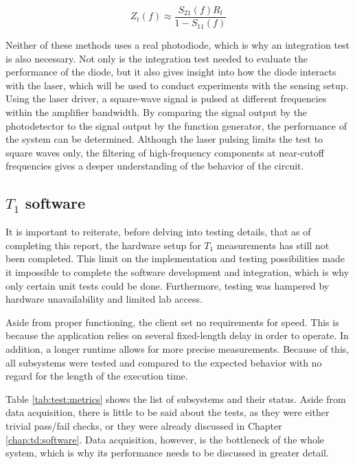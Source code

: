 \begin{equation}\label{eq:test:s11s22}
	Z_t(f) \approx \frac{S_{21}(f)R_l}{1 - S_{11}(f)}
\end{equation}

Neither of these methods uses a real photodiode, which is why an integration test is also necessary. Not only is the integration test needed to evaluate the performance of the diode, but it also gives insight into how the diode interacts with the laser, which will be used to conduct experiments with the sensing setup. Using the laser driver, a square-wave signal is pulsed at different frequencies within the amplifier bandwidth. By comparing the signal output by the photodetector to the signal output by the function generator, the performance of the system can be determined. Although the laser pulsing limits the test to square waves only, the filtering of high-frequency components at near-cutoff frequencies gives a deeper understanding of the behavior of the circuit.

\subsection{$T_1$ software}
It is important to reiterate, before delving into testing details, that as of completing this report, the hardware setup for $T_1$ measurements has still not been completed. This limit on the implementation and testing possibilities made it impossible to complete the software development and integration, which is why only certain unit tests could be done. Furthermore, testing was hampered by hardware unavailability and limited lab access.

Aside from proper functioning, the client set no requirements for speed. This is because the application relies on several fixed-length delay in order to operate. In addition, a longer runtime allows for more precise measurements. Because of this, all subsystems were tested and compared to the expected behavior with no regard for the length of the execution time.

Table \ref{tab:test:metrics} shows the list of subsystems and their status. Aside from data acquisition, there is little to be said about the tests, as they were either trivial pass/fail checks, or they were already discussed in Chapter \ref{chap:td:software}. Data acquisition, however, is the bottleneck of the whole system, which is why its performance needs to be discussed in greater detail.


